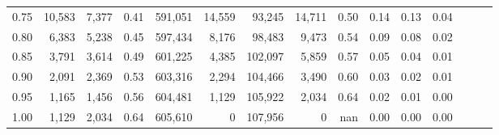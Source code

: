 \begin{tabular}{rrrrrrrrrrrrrrr}
0.75 &  10,583 &   7,377 &  0.41 &  591,051 &   14,559 &   93,245 &   14,711 &  0.50 &  0.14 &  0.13 &      0.04 \\
0.80 &   6,383 &   5,238 &  0.45 &  597,434 &    8,176 &   98,483 &    9,473 &  0.54 &  0.09 &  0.08 &      0.02 \\
0.85 &   3,791 &   3,614 &  0.49 &  601,225 &    4,385 &  102,097 &    5,859 &  0.57 &  0.05 &  0.04 &      0.01 \\
0.90 &   2,091 &   2,369 &  0.53 &  603,316 &    2,294 &  104,466 &    3,490 &  0.60 &  0.03 &  0.02 &      0.01 \\
0.95 &   1,165 &   1,456 &  0.56 &  604,481 &    1,129 &  105,922 &    2,034 &  0.64 &  0.02 &  0.01 &      0.00 \\
1.00 &   1,129 &   2,034 &  0.64 &  605,610 &        0 &  107,956 &        0 &   nan &  0.00 &  0.00 &      0.00 \\
\bottomrule
\end{tabular}
